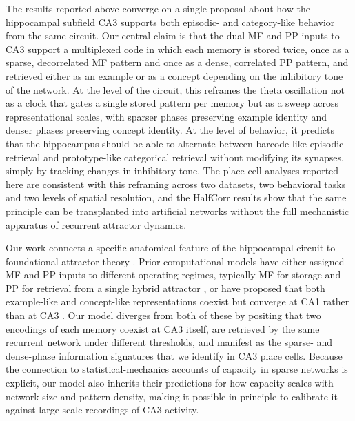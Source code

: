 \documentclass[11pt]{article}
\begin{document}
The results reported above converge on a single proposal about how the
hippocampal subfield CA3 supports both episodic- and category-like
behavior from the same circuit. Our central claim is that the dual MF and
PP inputs to CA3 support a multiplexed code in which each memory is
stored twice, once as a sparse, decorrelated MF pattern and once as a
dense, correlated PP pattern, and retrieved either as an example or as a
concept depending on the inhibitory tone of the network. At the level of the circuit, this reframes the theta
oscillation not as a clock that gates a single stored pattern per memory
but as a sweep across representational scales, with sparser phases
preserving example identity and denser phases preserving concept identity.
At the level of behavior, it predicts that the hippocampus should be able
to alternate between barcode-like episodic retrieval and prototype-like
categorical retrieval without modifying its synapses, simply by tracking
changes in inhibitory tone. The place-cell analyses reported here are
consistent with this reframing across two datasets, two behavioral tasks
and two levels of spatial resolution, and the HalfCorr results show that
the same principle can be transplanted into artificial networks without
the full mechanistic apparatus of recurrent attractor dynamics.

Our work connects a specific anatomical feature of the hippocampal circuit
to foundational attractor theory
\cite{hopfield1982neural,tsodyks1988enhanced,amit1985spin}. Prior
computational models have either assigned MF and PP inputs to different
operating regimes, typically MF for storage and PP for retrieval from a
single hybrid attractor \cite{treves1992computational}, or have proposed
that both example-like and concept-like representations coexist but
converge at CA1 rather than at CA3 \cite{schapiro2017complementary}. Our
model diverges from both of these by positing that two encodings of each
memory coexist at CA3 itself, are retrieved by the same recurrent network
under different thresholds, and manifest as the sparse- and dense-phase
information signatures that we identify in CA3 place cells. Because the
connection to statistical-mechanics accounts of capacity in sparse networks
is explicit, our model also inherits their predictions for how capacity
scales with network size and pattern density, making it possible in
principle to calibrate it against large-scale recordings of CA3 activity.
\end{document}

